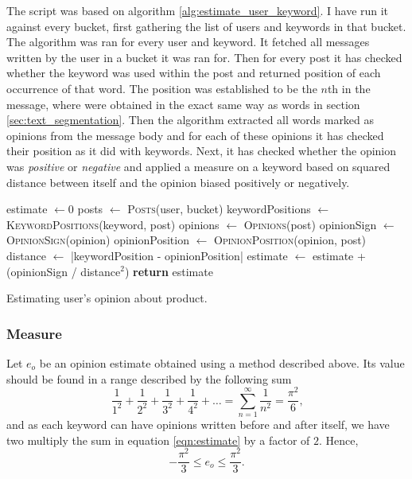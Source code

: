     The script was based on algorithm \ref{alg:estimate_user_keyword}. I have run it against every bucket, first gathering the list of users and keywords in that bucket.
    The algorithm was ran for every user and keyword. It fetched all messages written by the user in a bucket it was ran for. Then for every post it has checked whether the keyword was used within the post and returned position of each occurrence of that word. The position was established to be the $n$th  in the message, where  were obtained in the exact same way as words in section \ref{sec:text_segmentation}. Then the algorithm extracted all words marked as opinions from the message body and for each of these opinions it has checked their position as it did with keywords. Next, it has checked whether the opinion was \emph{positive} or \emph{negative} and applied a measure on a keyword based on squared distance between itself and the opinion biased positively or negatively.
    \begin{algorithm}[H]
      \begin{algorithmic}[1]
          \State estimate $\gets 0$
          \State posts $\gets$ \textsc{Posts}(user, bucket)
            \State keywordPositions $\gets$ \textsc{KeywordPositions}(keyword, post)
              \State opinions $\gets$ \textsc{Opinions}(post)
                \State opinionSign $\gets$ \textsc{OpinionSign}(opinion)
                \State opinionPosition $\gets$ \textsc{OpinionPosition}(opinion, post)
                \State distance $\gets$ |keywordPosition - opinionPosition|
                \State estimate $\gets$ estimate + (opinionSign / distance$^2$)
              \EndFor
            \EndFor
          \EndFor
          \State \textbf{return} estimate
        \EndProcedure
      \end{algorithmic}
      \caption{Estimating user's opinion about product.}
      \label{alg:estimate_user_keyword}
    \end{algorithm}

    \subsubsection{Measure}

      Let $e_o$ be an opinion estimate obtained using a method described above. Its value should be found in a range described by the following sum
      \begin{equation}
        \frac{1}{1^2} + \frac{1}{2^2} + \frac{1}{3^2} + \frac{1}{4^2} + \ldots = \sum_{n=1}^{\infty} \frac{1}{n^2} = \frac{\pi^2}{6} \mbox{,} \label{eqn:estimate}
      \end{equation}
      and as each keyword can have opinions written before and after itself, we have two multiply the sum in equation \ref{eqn:estimate} by a factor of $2$. Hence,
      \begin{equation}
        -\frac{\pi^2}{3} \leq e_o \leq \frac{\pi^2}{3} \mbox{.} \label{eqn:estimate_limits}
      \end{equation}
      
